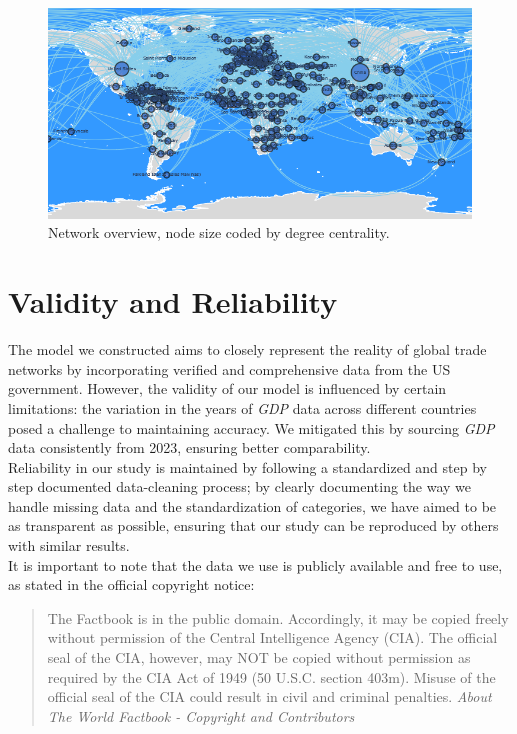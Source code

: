 \documentclass[12pt, a4paper]{article}
\begin{document}
\begin{figure}[ht]
\centering
\includegraphics[width=.9\textwidth]{figures/question1/figure_1.png}
\captionsetup{font=scriptsize,labelfont=bf}
\caption{Network overview, node size coded by degree centrality.}
\label{fig:figure1}
\end{figure}

\section{Validity and Reliability}
\label{validity-and-reliability-not-needed-for-the-project-proposal}

The model we constructed aims to closely represent the reality of global trade networks by incorporating verified and comprehensive data from the US government. However, the validity of our model is influenced by certain limitations: the variation in the years of \textit{GDP} data across different countries posed a challenge to maintaining accuracy. We mitigated this by sourcing \textit{GDP} data consistently from 2023, ensuring better comparability.\\

Reliability in our study is maintained by following a standardized and step by step documented data-cleaning process; by clearly documenting the way we handle missing data and the standardization of categories, we have aimed to be as transparent as possible, ensuring that our study can be reproduced by others with similar results.\\

It is important to note that the data we use is publicly available and free to use, as stated in the official copyright notice:
\begin{quote}
The Factbook is in the public domain. Accordingly, it may be copied freely without permission of the Central Intelligence Agency (CIA). The official seal of the CIA, however, may NOT be copied without permission as required by the CIA Act of 1949 (50 U.S.C. section 403m). Misuse of the official seal of the CIA could result in civil and criminal penalties. \textit{About The World Factbook - Copyright and Contributors}
\end{quote}
\end{document}
